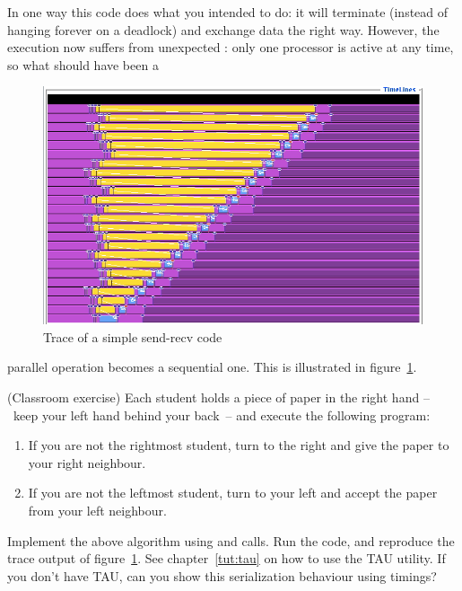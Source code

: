 In one way this code does what you intended to do:
it will terminate (instead of hanging forever on a
deadlock) and exchange data the right way. However, the execution
now suffers from unexpected : only
one processor is active at any time, so what should have been a
%
\begin{figure}[ht]
\includegraphics[scale=.4]{graphics/linear-serial}
\caption{Trace of a simple send-recv code}
\label{fig:serialization}
\end{figure}
%
parallel operation becomes a sequential one. This is illustrated in
figure~\ref{fig:serialization}.
\begin{exercise}
  \label{ex:serialsend}
  (Classroom exercise) Each student holds a piece of paper
  in the right hand --~keep your left hand behind your back~--
  and execute the following program:
  \begin{enumerate}
  \item If you are not the rightmost student, turn to the right
    and give the paper to your right neighbour.
  \item If you are not the leftmost student, turn to your left and
    accept the paper from your left neighbour.
  \end{enumerate}
\end{exercise}

\begin{exercise}
  \label{ex:linear-sequential}
  Implement the above algorithm using  and  calls.
  Run the code, and reproduce the trace output 
  of figure~\ref{fig:serialization}. See chapter~\ref{tut:tau}
  on how to use the TAU utility. If you don't have TAU, can you show this serialization
  behaviour using timings?
\end{exercise}

